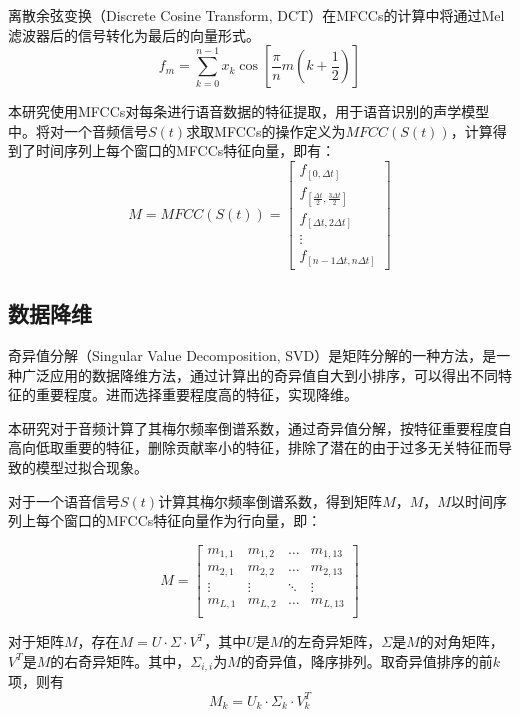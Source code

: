 \documentclass[lang=cn,cite=super]{elegantpaper}
\begin{document}
离散余弦变换（Discrete Cosine Transform, DCT）在MFCCs的计算中将通过Mel滤波器后的信号转化为最后的向量形式。
\begin{equation}
    f_m = \sum_{k=0}^{n-1} x_k \cos [\frac{\pi}{n}m(k+\frac{1}{2})]
\end{equation}

本研究使用MFCCs对每条进行语音数据的特征提取，用于语音识别的声学模型中。将对一个音频信号$S(t)$求取MFCCs的操作定义为${MFCC}(S(t))$，计算得到了时间序列上每个窗口的MFCCs特征向量，即有：
\begin{equation}
    M = MFCC(S(t)) = 
    \begin{bmatrix}
        f_{[0,\Delta t]}\\
        f_{[\frac{\Delta t}{2},\frac{3\Delta t}{2}]}\\
        f_{[\Delta t,2\Delta t]}\\
        \vdots\\
        f_{[n-1\Delta t,n\Delta t]}
    \end{bmatrix}
\end{equation}
\subsection{数据降维}
奇异值分解（Singular Value Decomposition, SVD）是矩阵分解的一种方法，是一种广泛应用的数据降维方法，通过计算出的奇异值自大到小排序，可以得出不同特征的重要程度。进而选择重要程度高的特征，实现降维。

本研究对于音频计算了其梅尔频率倒谱系数，通过奇异值分解，按特征重要程度自高向低取重要的特征，删除贡献率小的特征，排除了潜在的由于过多无关特征而导致的模型过拟合现象。

对于一个语音信号$S(t)$计算其梅尔频率倒谱系数，得到矩阵$M$，$M$，$M$以时间序列上每个窗口的MFCCs特征向量作为行向量，即：

\begin{equation}
    M = 
    \begin{bmatrix}
        m_{1,1} & m_{1,2} & \ldots & m_{1,13} \\
        m_{2,1} & m_{2,2} & \ldots & m_{2,13} \\
        \vdots & \vdots & \ddots & \vdots \\
        m_{L,1} & m_{L,2} & \ldots & m_{L,13}\\
    \end{bmatrix}
\end{equation}

对于矩阵$M$，存在$M = U \cdot \Sigma \cdot V^T$，其中$U$是$M$的左奇异矩阵，$\Sigma$是$M$的对角矩阵，$V^T$是$M$的右奇异矩阵。其中，$\Sigma_{i,i}$为$M$的奇异值，降序排列。取奇异值排序的前$k$项，则有
\begin{equation}
    M_k = U_k \cdot \Sigma_k \cdot V^T_k
\end{equation}
\end{document}
